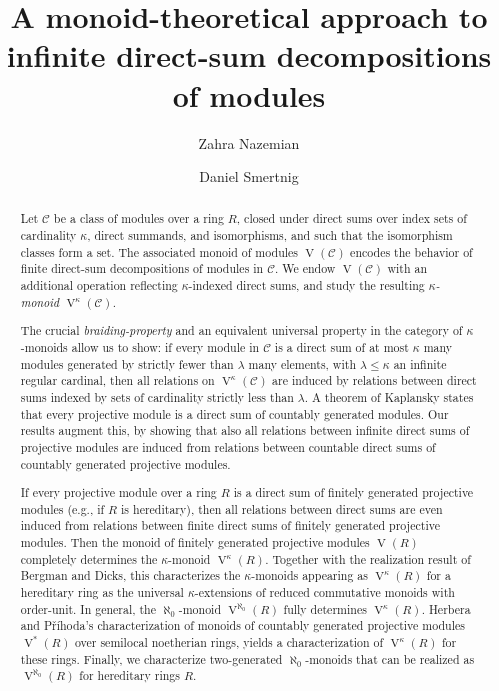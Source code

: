 \documentclass[a4paper,11pt,oneside]{amsart}
\title[Infinite direct sums via monoids]{A monoid-theoretical approach to infinite direct-sum decompositions of modules}
\author{Zahra Nazemian}
\author{Daniel Smertnig}
\theoremstyle{remark}
\newcommand{\cC}{\mathcal C}
\DeclareMathOperator{\Vmon}{V}
\begin{document}
\begin{abstract}
  Let $\cC$ be a class of modules over a ring $R$, closed under direct sums over index sets of cardinality $\kappa$, direct summands, and isomorphisms, and such that the isomorphism classes form a set.
  The associated monoid of modules $\Vmon(\cC)$ encodes the behavior of finite direct-sum decompositions of modules in $\cC$.
  We endow $\Vmon(\cC)$ with an additional operation reflecting $\kappa$-indexed direct sums, and study the resulting \emph{$\kappa$-monoid} $\Vmon^{\kappa}(\cC)$.

  The crucial \emph{braiding-property} and an equivalent universal property in the category of $\kappa$-monoids allow us to show: if every module in $\cC$ is a direct sum of at most $\kappa$ many modules generated by strictly fewer than $\lambda$ many elements, with $\lambda \le \kappa$ an infinite regular cardinal, then all relations on  $\Vmon^{\kappa}(\cC)$ are induced by relations between direct sums indexed by sets of cardinality strictly less than $\lambda$.
  A theorem of Kaplansky states that every projective module is a direct sum of countably generated modules.
  Our results augment this, by showing that also all relations between infinite direct sums of projective modules are induced from relations between countable direct sums of countably generated projective modules.
  
  If every projective module over a ring $R$ is a direct sum of finitely generated projective modules (e.g., if $R$ is hereditary), then all relations between direct sums are even induced from relations between finite direct sums of finitely generated projective modules.
  Then the monoid of finitely generated projective modules $\Vmon(R)$ completely determines the $\kappa$-monoid $\Vmon^{\kappa}(R)$.
  Together with the realization result of Bergman and Dicks, this characterizes the $\kappa$-monoids appearing as $\Vmon^{\kappa}(R)$ for a hereditary ring as the universal $\kappa$-extensions of reduced commutative monoids with order-unit.
  In general, the $\aleph_0$-monoid $\Vmon^{\aleph_0}(R)$ fully determines $\Vmon^{\kappa}(R)$.
  Herbera and Příhoda's characterization of monoids of countably generated projective modules $\Vmon^*(R)$ over semilocal noetherian rings, yields a characterization of $\Vmon^{\kappa}(R)$ for these rings.
  Finally, we characterize two-generated $\aleph_0$-monoids that can be realized as $\Vmon^{\aleph_0}(R)$ for hereditary rings $R$.
\end{abstract}
\end{document}
